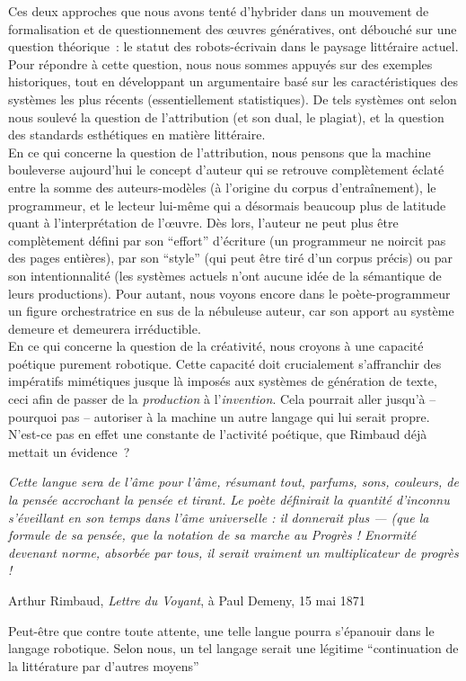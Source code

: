 \documentclass{article}
\newenvironment{citationbox}
{\begin{center}
		\begin{minipage}{.8\textwidth}
		}
		{
		\end{minipage}	
\end{center}
}
\begin{document}
		Ces deux approches que nous avons tenté d'hybrider dans un mouvement de formalisation et de questionnement des œuvres génératives, ont débouché sur une question théorique~: le statut des robots-écrivain dans le paysage littéraire actuel. Pour répondre à cette question, nous nous sommes appuyés sur des exemples historiques, tout en développant un argumentaire basé sur les caractéristiques des systèmes les plus récents (essentiellement statistiques). De tels systèmes ont selon nous soulevé la question de l'attribution (et son dual, le plagiat), et la question des standards esthétiques en matière littéraire.\\
		En ce qui concerne la question de l'attribution, nous pensons que la machine bouleverse aujourd'hui le concept d'auteur qui se retrouve complètement éclaté entre la somme des auteurs-modèles (à l'origine du corpus d'entraînement), le programmeur, et le lecteur lui-même qui a désormais beaucoup plus de latitude quant à l'interprétation de l'œuvre. Dès lors, l'auteur ne peut plus être complètement défini par son ``effort'' d'écriture (un programmeur ne noircit pas des pages entières), par son ``style'' (qui peut être tiré d'un corpus précis) ou par son intentionnalité (les systèmes actuels n'ont aucune idée de la sémantique de leurs productions). Pour autant, nous voyons encore dans le poète-programmeur un figure orchestratrice en sus de la nébuleuse auteur, car son apport au système demeure et demeurera irréductible.\\
		En ce qui concerne la question de la créativité, nous croyons à une capacité poétique purement robotique. Cette capacité doit crucialement s'affranchir des impératifs mimétiques jusque là imposés aux systèmes de génération de texte, ceci afin de passer de la \textit{production} à l'\textit{invention}. Cela pourrait aller jusqu'à -- pourquoi pas -- autoriser à la machine un autre langage qui lui serait propre. N'est-ce pas en effet une constante de l'activité poétique, que Rimbaud déjà mettait un évidence~?
		\begin{citationbox}
			\textit{Cette langue sera de l’âme pour l’âme, résumant tout, parfums, sons, couleurs, de la pensée accrochant la pensée et tirant. Le poète définirait la quantité d’inconnu s’éveillant en son temps dans l’âme universelle : il donnerait plus — (que la formule de sa pensée, que la notation de sa marche au Progrès ! Enormité devenant norme, absorbée par tous, il serait vraiment un multiplicateur de progrès !}\begin{flushright}
				Arthur Rimbaud, \textit{Lettre du Voyant}, à Paul Demeny, 15 mai 1871
			\end{flushright}
		\end{citationbox}
		Peut-être que contre toute attente, une telle langue pourra s'épanouir dans le langage robotique. Selon nous, un tel langage serait une légitime ``continuation de la littérature par d'autres moyens''
		
\end{document}
